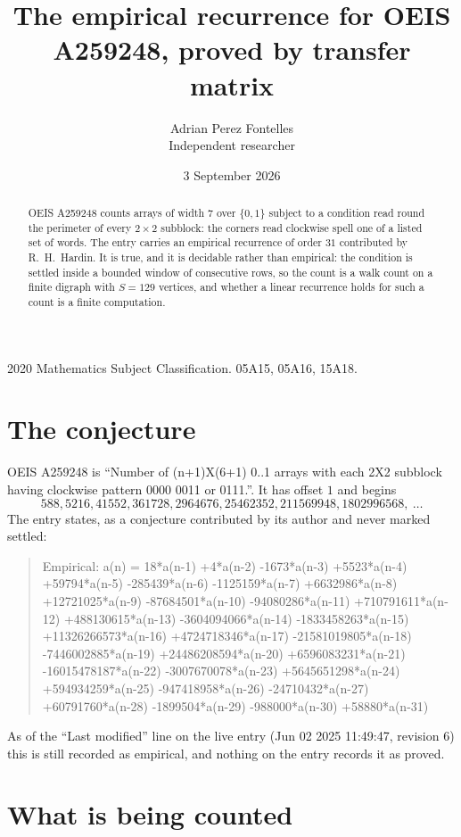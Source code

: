 \documentclass[11pt,a4paper]{article}
\title{The empirical recurrence for OEIS A259248, proved by transfer matrix}
\author{Adrian Perez Fontelles\\ \small Independent researcher}
\date{3 September 2026}
\theoremstyle{plain}
\theoremstyle{definition}
\begin{document}
\maketitle

\begin{abstract}
OEIS A259248 counts arrays of width $7$ over $\{0,1\}$ subject to a condition read round the
perimeter of every $2\times2$ subblock: the corners read clockwise spell one of a listed set of words. The entry carries an empirical recurrence of
order $31$ contributed by R.~H.~Hardin. It is true, and it is decidable rather than
empirical: the condition is settled inside a bounded window of consecutive rows, so the
count is a walk count on a finite digraph with $S=129$ vertices, and whether a linear
recurrence holds for such a count is a finite computation.
\end{abstract}

\noindent\small 2020 Mathematics Subject Classification. 05A15, 05A16, 15A18.\normalsize

\section{The conjecture}

OEIS A259248 is ``Number of (n+1)X(6+1) 0..1 arrays with each 2X2 subblock having clockwise pattern 0000 0011 or 0111.''. It has offset $1$ and begins
\[
588, 5216, 41552, 361728, 2964676, 25462352, 211569948, 1802996568,\ \dots
\]
The entry states, as a conjecture contributed by its author and never marked settled:
\begin{quote}
Empirical: a(n) = 18*a(n-1) +4*a(n-2) -1673*a(n-3) +5523*a(n-4) +59794*a(n-5) -285439*a(n-6) -1125159*a(n-7) +6632986*a(n-8) +12721025*a(n-9) -87684501*a(n-10) -94080286*a(n-11) +710791611*a(n-12) +488130615*a(n-13) -3604094066*a(n-14) -1833458263*a(n-15) +11326266573*a(n-16) +4724718346*a(n-17) -21581019805*a(n-18) -7446002885*a(n-19) +24486208594*a(n-20) +6596083231*a(n-21) -16015478187*a(n-22) -3007670078*a(n-23) +5645651298*a(n-24) +594934259*a(n-25) -947418958*a(n-26) -24710432*a(n-27) +60791760*a(n-28) -1899504*a(n-29) -988000*a(n-30) +58880*a(n-31)
\end{quote}
As of the ``Last modified'' line on the live entry (Jun 02 2025 11:49:47, revision 6) this is still
recorded as empirical, and nothing on the entry records it as proved.

\section{What is being counted}
\end{document}
